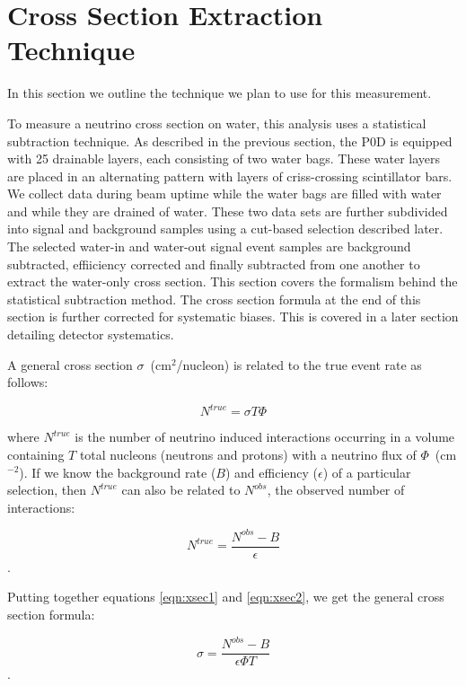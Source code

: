 \section{Cross Section Extraction Technique}
\label{sec:xsec}

In this section we outline the technique we plan to use for this measurement.

To measure a neutrino cross section on water, this analysis uses a statistical subtraction technique. As described in the previous section, the P0D is equipped with 25 drainable layers, each consisting of two water bags. These water layers are placed in an alternating pattern with layers of criss-crossing scintillator bars. We collect data during beam uptime while the water bags are filled with water and while they are drained of water. These two data sets are further subdivided into signal and background samples using a cut-based selection described later. The selected water-in and water-out signal event samples are background subtracted, effiiciency corrected and finally subtracted from one another to extract the water-only cross section. This section covers the formalism behind the statistical subtraction method. The cross section formula at the end of this section is further corrected for systematic biases. This is covered in a later section detailing detector systematics.

A general cross section $\sigma$~(cm$^2$/nucleon) is related to the true event rate as
follows:

\begin{equation}
N^{true} = \sigma T \Phi
\label{eqn:xsec1}
\end{equation}

where $N^{true}$ is the number of neutrino induced interactions
occurring in a volume containing $T$ total nucleons (neutrons and protons) with
a neutrino flux of $\Phi$~(cm$^{-2}$). If we know the background rate ($B$)
and efficiency ($\epsilon$) of a particular selection, then $N^{true}$ can also be
related to $N^{obs}$, the observed number of interactions:

\begin{equation}
N^{true}=\frac{N^{obs}-B}{\epsilon}
\label{eqn:xsec2}
\end{equation}.

Putting together equations \ref{eqn:xsec1} and \ref{eqn:xsec2}, we get
the general cross section formula:

\begin{equation}
\sigma = \frac{N^{obs}-B}{\epsilon \Phi T}
\label{eqn:xsec3}
\end{equation}.


